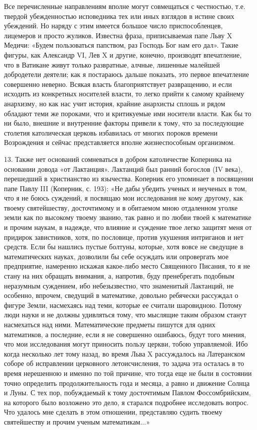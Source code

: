 Все перечисленные направлениям вполне могут совмещаться с честностью,
т.е. твердой убежденностью исповедника тех или иных взглядов в истине
своих убеждений. Но наряду с этим имеется большое число
приспособленцев, лицемеров и просто жуликов. Известна фраза,
приписываемая папе Льву X Медичи: «Будем пользоваться папством, раз
Господь Бог нам его дал». Такие фигуры, как Александр VI, Лев X и
другие, конечно, производят впечатление, что в Ватикане живут только
развратные, алчные, лишенные малейшей добродетели деятели; как я
постараюсь дальше показать, это первое впечатление совершенно неверно.
Всякая власть благоприятствует развращению, и если исходить из
конкретных носителей власти, то легко прийти к самому крайнему
анархизму, но как нас учит история, крайние анархисты сплошь и рядом
обладают теми же пороками, что и критикуемые ими носители власти. Как
бы то ни было, внешние и внутренние факторы привели к тому, что за
последующие столетия католическая церковь избавилась от многих пороков
времени Возрождения и сейчас представляется вполне жизнеспособным
организмом.

13. Также нет оснований сомневаться в добром католичестве Коперника на
основании довода «от Лактанция». Лактанций был ранний богослов (IV
века), перешедший в христианство из язычества. Коперник его упоминает
в посвящении папе Павлу III (Коперник, с. 193): «Не дабы убедить
ученых и неученых в том, что я не боюсь суждений, я посвящаю мои
исследования не кому другому, как твоему святейшеству, досточтимому и
в обитаемом мною отдаленном уголке земли как по высокому твоему
званию, так равно и по любви твоей к математике и прочим наукам, в
надежде, что влияние и суждение твое легко защитят меня от придирок
завистников, хотя, по пословице, против укушения интриганов и нет
средств. Если бы нашлись пустые болтуны, которые, хотя вовсе не
сведущие в математических науках, дозволили бы себе осуждать или
опровергать мое предприятие, намеренно искажая какое-либо место
Священного Писания, то я не стану на них обращать внимания, а,
напротив, буду пренебрегать подобным неразумным суждением, ибо
небезызвестно, что знаменитый Лактанций, не особенно, впрочем,
сведущий в математике, довольно ребячески рассуждал о фигуре Земли,
насмехаясь над теми, которые ее считали шаровидною. Потому люди науки
и не должны удивляться тому, что мыслящие таким образом станут
насмехаться над ними. Математические предметы пишутся для одних
математиков, а последние, если я не совершенно ошибаюсь, будут того
мнения, что мои исследования могут приносить пользу церкви, тобою
управляемой. Ибо когда несколько лет тому назад, во время Льва X
рассуждалось на Латеранском соборе об исправлении церковного
летоисчисления, то задача эта осталась в то время нерешенною и именно
по той причине, что тогда еще не были в состоянии точно определить
продолжительность года и месяца, а равно и движение Солнца и Луны. С
тех пор, побуждаемый к тому досточтимым Павлом Фоссомбрийским, на
которого было возложено это дело, я старался подробнее исследовать
вопрос. Что удалось мне сделать в этом отношении, представляю судить
твоему святейшеству и прочим ученым математикам...»

